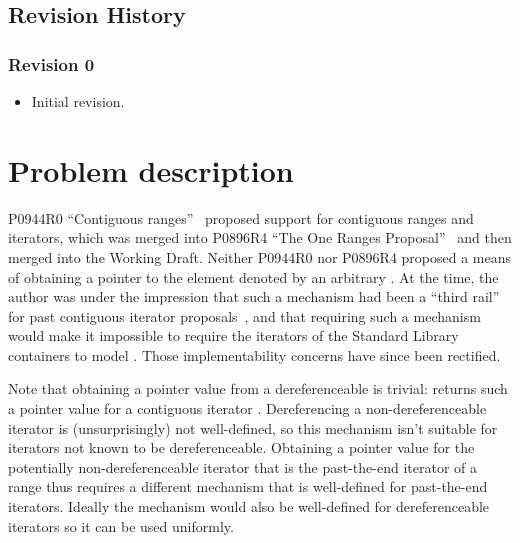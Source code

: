 \section{Revision History}
\subsection{Revision 0}
\begin{itemize}
\item Initial revision.
\end{itemize}

\chapter{Problem description}

P0944R0 ``Contiguous ranges''~\cite{P0944} proposed support for contiguous
ranges and iterators, which was merged into P0896R4 ``The One Ranges
Proposal''~\cite{P0896R4} and then merged into the Working Draft. Neither
P0944R0 nor P0896R4 proposed a means of obtaining a pointer to the element
denoted by an arbitrary . At the time, the author was
under the impression that such a mechanism had been a ``third rail'' for past
contiguous iterator proposals~\cite{N4183}, and that requiring such a mechanism
would make it impossible to require the iterators of the Standard Library
containers to model . Those implementability concerns
have since been rectified.

Note that obtaining a pointer value from a dereferenceable
 is trivial:  returns such a
pointer value for a contiguous iterator . Dereferencing a
non-dereferenceable iterator is (unsurprisingly) not well-defined, so this
mechanism isn't suitable for iterators not known to be dereferenceable.
Obtaining a pointer value for the potentially non-dereferenceable iterator
 that is the past-the-end iterator of a range  thus
requires a different mechanism that is well-defined for past-the-end iterators.
Ideally the mechanism would also be well-defined for dereferenceable iterators
so it can be used uniformly.

